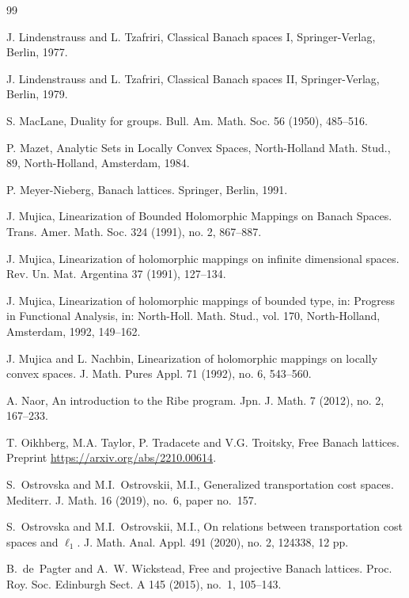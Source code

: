 \documentclass[12pt,leqno]{amsart}
\numberwithin{equation}{section} %
\theoremstyle{definition}
\numberwithin{equation}{section}
\begin{document}
\begin{thebibliography}{99}

 J. Lindenstrauss and L. Tzafriri, Classical Banach spaces I, Springer-Verlag, Berlin, 1977.

 J. Lindenstrauss and L. Tzafriri, Classical Banach spaces II, Springer-Verlag, Berlin, 1979.

S. MacLane, Duality for groups. Bull. Am. Math. Soc. 56 (1950), 485--516. 

P. Mazet, Analytic Sets in Locally Convex Spaces, North-Holland Math. Stud., 89, North-Holland, Amsterdam, 1984.

 P. Meyer-Nieberg,
Banach lattices. Springer, Berlin, 1991.

 J. Mujica, Linearization of Bounded Holomorphic Mappings on Banach Spaces. Trans. Amer. Math. Soc. 324 (1991), no. 2, 867--887.

 J. Mujica, Linearization of holomorphic mappings on infinite dimensional spaces. Rev. Un. Mat. Argentina 37 (1991), 127--134.

J. Mujica, Linearization of holomorphic mappings of bounded type, in: Progress in Functional Analysis, in: North-Holl. Math. Stud., vol. 170, North-Holland, Amsterdam, 1992, 149--162.


 J. Mujica and L. Nachbin, Linearization of holomorphic mappings on locally convex spaces. J. Math. Pures Appl. 71 (1992), no. 6, 543--560.

 A. Naor, An introduction to the Ribe program. Jpn. J. Math. 7 (2012), no. 2, 167--233. 



T. Oikhberg, M.A. Taylor, P. Tradacete and V.G. Troitsky, Free Banach lattices. Preprint \url{https://arxiv.org/abs/2210.00614}.


S.~Ostrovska and M.I.~Ostrovskii, M.I., Generalized transportation cost spaces. Mediterr. J. Math.
16 (2019), no.~6, paper no.~157.

S.~Ostrovska and M.I.~Ostrovskii, M.I., On relations between transportation cost spaces and $\ell_1$. J. Math. Anal. Appl. 491 (2020), no. 2, 124338, 12 pp.


 B.~de~Pagter and A.~W. Wickstead, Free and projective {B}anach lattices.
   Proc. Roy. Soc. Edinburgh Sect. A 145 (2015), no.~1, 105--143.


\end{thebibliography}
\end{document}
